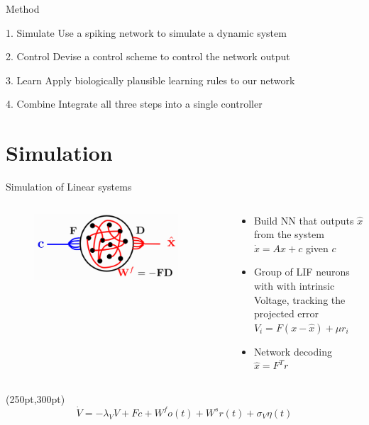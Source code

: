 \documentclass[17pt, t, lualatex]{beamer}
\begin{document}
\begin{frame}{Method}
	\begin{block}{1. Simulate}
		Use a spiking network to simulate a dynamic system
	\end{block}

	\begin{block}{2. Control}
		Devise a control scheme to control the network output
	\end{block}
	\begin{block}{3. Learn}
		Apply biologically plausible learning rules to our network
	\end{block}

	\begin{block}{4. Combine}
		Integrate all three steps into a single controller
	\end{block}

\end{frame}


\section{Simulation}\insertsectionpage
\begin{frame}{Simulation of Linear systems}
	\begin{columns}[T]
		\begin{column}{0.45\textwidth}
			\begin{figure}
				\includegraphics[width=0.9\textwidth]{figures/autoencoder2.png}
			\end{figure}
		\end{column}
		\begin{column}{0.45\textwidth}
			\begin{itemize}
				\item Build NN that outputs $\hat{x}$ from the system $\dot{x} = Ax + c$ given $c$\\
				\item Group of LIF neurons with with intrinsic Voltage, tracking the projected error $V_{i} = F(x-\hat{x})+\mu r_{i}$\\
				\item Network decoding $\hat{x} =F^Tr$
			\end{itemize}
		\end{column}
	\end{columns}
	\begin{textblock*}{20pt}(250pt,300pt)
		\begin{equation*}
			\dot{V} = -\lambda_{V}V+Fc+W^{f}o(t)+W^{s}r(t)+\sigma _{V}\eta(t)	
		\end{equation*}
	\end{textblock*}
\end{frame}
\end{document}
